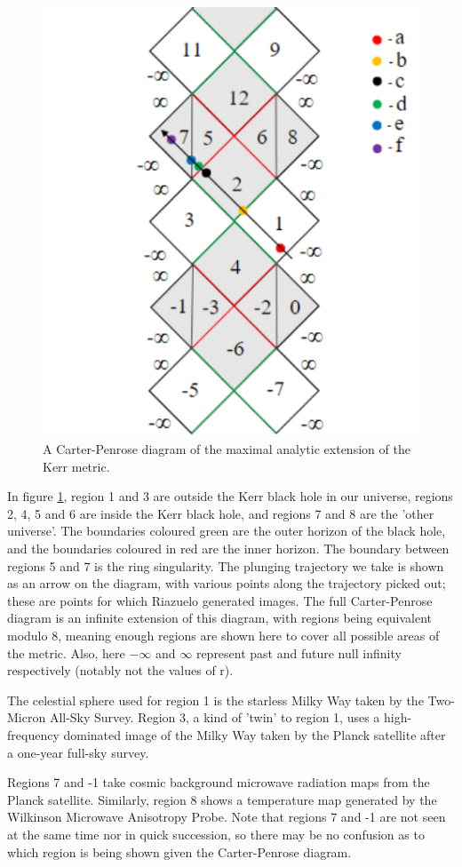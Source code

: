 \documentclass[oneside,openright,frontopenright, singlespacing]{dmathesis}
\begin{document}
\begin{figure}[!ht]
	\centering
	\includegraphics[width=0.4\linewidth]{img/carter-penrose-kerr}
	\caption{A Carter-Penrose diagram of the maximal analytic extension of the Kerr metric.}
	\label{fig:Figure6.3}
\end{figure}

	In figure \ref{fig:Figure6.3}, region 1 and 3 are outside the Kerr black hole in our universe, regions 2, 4, 5 and 6 are inside the Kerr black hole, and regions 7 and 8 are the 'other universe'. The boundaries coloured green are the outer horizon of the black hole, and the boundaries coloured in red are the inner horizon. The boundary between regions 5 and 7 is the ring singularity. The plunging trajectory we take is shown as an arrow on the diagram, with various points along the trajectory picked out; these are points for which Riazuelo generated images. The full Carter-Penrose diagram is an infinite extension of this diagram, with regions being equivalent modulo 8, meaning enough regions are shown here to cover all possible areas of the metric. Also, here $-\infty$ and $\infty$ represent past and future null infinity respectively (notably not the values of r).

\vspace{1em}
	The celestial sphere used for region 1 is the starless Milky Way taken by the Two-Micron All-Sky Survey\cite{skrutskie2006two}. Region 3, a kind of 'twin' to region 1, uses a high-frequency dominated image of the Milky Way taken by the Planck satellite after a one-year full-sky survey\cite{planck2011astronomy}.

\vspace{1em}
	Regions 7 and -1 take cosmic background microwave radiation maps from the Planck satellite\cite{adam2016planck}. Similarly, region 8 shows a temperature map generated by the Wilkinson Microwave Anisotropy Probe\cite{bennet2013wmap}. Note that regions 7 and -1 are not seen at the same time nor in quick succession, so there may be no confusion as to which region is being shown given the Carter-Penrose diagram.
\end{document}
